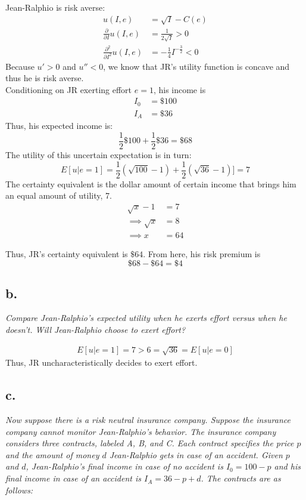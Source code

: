 \documentclass[
]{article}
\begin{document}
Jean-Ralphio is risk averse:\\
\[\begin{aligned} 
u(I, e) &= \sqrt{I} - C(e) \\
\frac{\partial}{\partial I} u(I, e) &= \frac{1}{2\sqrt{I}} > 0 \\
\frac{\partial^2}{\partial I^2} u(I, e) &= -\frac{1}{4}I^{-\frac{3}{2}} < 0
\end{aligned}\] Because \(u' > 0\) and \(u'' <0\), we know that JR's
utility function is concave and thus he is risk averse.\\
Conditioning on JR exerting effort \(e=1\), his income is
\[\begin{aligned}
I_0 &= \$100 \\
I_A &= \$36
\end{aligned}\] Thus, his expected income is:
\[\frac{1}{2} \$100 + \frac{1}{2} \$36 = \$ 68\] The utility of this
uncertain expectation is in turn:
\[E[u|e=1] = \frac{1}{2} (\sqrt{100} - 1) + \frac{1}{2} (\sqrt{36} - 1)]= 7\]
The certainty equivalent is the dollar amount of certain income that
brings him an equal amount of utility, 7. \[\begin{aligned} 
\sqrt{x} - 1 &= 7 \\
\implies \sqrt{x} &= 8 \\
\implies x &= 64
\end{aligned}\]

Thus, JR's certainty equivalent is \(\$ 64\). From here, his risk
premium is \[\$68 - \$64 = \$4\]

\hypertarget{b.-3}{%
\subsection{b.}\label{b.-3}}

\textit{Compare Jean-Ralphio’s expected utility when he exerts effort versus when he doesn’t. Will Jean-Ralphio choose to exert effort?}

\[\begin{aligned} 
E[u|e=1] = 7 > 6 = \sqrt{36} =  E[u|e=0]
\end{aligned}\] Thus, JR uncharacteristically decides to exert effort.

\hypertarget{c.-3}{%
\subsection{c.~}\label{c.-3}}

\textit{Now suppose there is a risk neutral insurance company. Suppose the insurance company cannot monitor Jean-Ralphio’s behavior. The insurance company considers three contracts, labeled A, B, and C. Each contract specifies the price $p$ and the amount of money $d$ Jean-Ralphio gets in case of an accident. Given $p$ and $d$, Jean-Ralphio’s final income in case of no accident is $I_0 = 100 − p$ and his final income in case of an accident is $I_A = 36 − p + d$. The contracts are as follows:}
\end{document}
